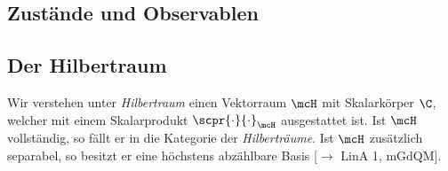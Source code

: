 \documentclass{subfiles}
\begin{document}
    \subsection{Zustände und Observablen}


    \subsection{Der Hilbertraum}
        Wir verstehen unter \emph{Hilbertraum} einen Vektorraum $\mcH$ mit Skalarkörper $\C$, welcher mit einem Skalarprodukt $\scpr{\cdot}{\cdot}_\mcH$ ausgestattet ist. Ist $\mcH$ vollständig, so fällt er in die Kategorie der \emph{Hilberträume}. Ist $\mcH$ zusätzlich separabel, so besitzt er eine höchstens abzählbare Basis [$\to$ LinA 1, mGdQM].
\end{document}
